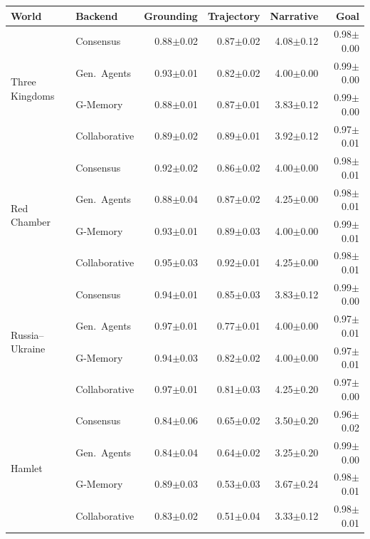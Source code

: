 \begin{tabular}{llrrrr}
\toprule
World & Backend & Grounding & Trajectory & Narrative & Goal \\
\midrule
\multirow{4}{*}{Three Kingdoms} & Consensus & 0.88\tiny$\pm$0.02 & 0.87\tiny$\pm$0.02 & 4.08\tiny$\pm$0.12 & 0.98\tiny$\pm$0.00 \\
 & Gen.\ Agents & 0.93\tiny$\pm$0.01 & 0.82\tiny$\pm$0.02 & 4.00\tiny$\pm$0.00 & 0.99\tiny$\pm$0.00 \\
 & G-Memory & 0.88\tiny$\pm$0.01 & 0.87\tiny$\pm$0.01 & 3.83\tiny$\pm$0.12 & 0.99\tiny$\pm$0.00 \\
 & Collaborative & 0.89\tiny$\pm$0.02 & 0.89\tiny$\pm$0.01 & 3.92\tiny$\pm$0.12 & 0.97\tiny$\pm$0.01 \\
\midrule
\multirow{4}{*}{Red Chamber} & Consensus & 0.92\tiny$\pm$0.02 & 0.86\tiny$\pm$0.02 & 4.00\tiny$\pm$0.00 & 0.98\tiny$\pm$0.01 \\
 & Gen.\ Agents & 0.88\tiny$\pm$0.04 & 0.87\tiny$\pm$0.02 & 4.25\tiny$\pm$0.00 & 0.98\tiny$\pm$0.01 \\
 & G-Memory & 0.93\tiny$\pm$0.01 & 0.89\tiny$\pm$0.03 & 4.00\tiny$\pm$0.00 & 0.99\tiny$\pm$0.01 \\
 & Collaborative & 0.95\tiny$\pm$0.03 & 0.92\tiny$\pm$0.01 & 4.25\tiny$\pm$0.00 & 0.98\tiny$\pm$0.01 \\
\midrule
\multirow{4}{*}{Russia--Ukraine} & Consensus & 0.94\tiny$\pm$0.01 & 0.85\tiny$\pm$0.03 & 3.83\tiny$\pm$0.12 & 0.99\tiny$\pm$0.00 \\
 & Gen.\ Agents & 0.97\tiny$\pm$0.01 & 0.77\tiny$\pm$0.01 & 4.00\tiny$\pm$0.00 & 0.97\tiny$\pm$0.01 \\
 & G-Memory & 0.94\tiny$\pm$0.03 & 0.82\tiny$\pm$0.02 & 4.00\tiny$\pm$0.00 & 0.97\tiny$\pm$0.01 \\
 & Collaborative & 0.97\tiny$\pm$0.01 & 0.81\tiny$\pm$0.03 & 4.25\tiny$\pm$0.20 & 0.97\tiny$\pm$0.00 \\
\midrule
\multirow{4}{*}{Hamlet} & Consensus & 0.84\tiny$\pm$0.06 & 0.65\tiny$\pm$0.02 & 3.50\tiny$\pm$0.20 & 0.96\tiny$\pm$0.02 \\
 & Gen.\ Agents & 0.84\tiny$\pm$0.04 & 0.64\tiny$\pm$0.02 & 3.25\tiny$\pm$0.20 & 0.99\tiny$\pm$0.00 \\
 & G-Memory & 0.89\tiny$\pm$0.03 & 0.53\tiny$\pm$0.03 & 3.67\tiny$\pm$0.24 & 0.98\tiny$\pm$0.01 \\
 & Collaborative & 0.83\tiny$\pm$0.02 & 0.51\tiny$\pm$0.04 & 3.33\tiny$\pm$0.12 & 0.98\tiny$\pm$0.01 \\
\bottomrule
\end{tabular}
